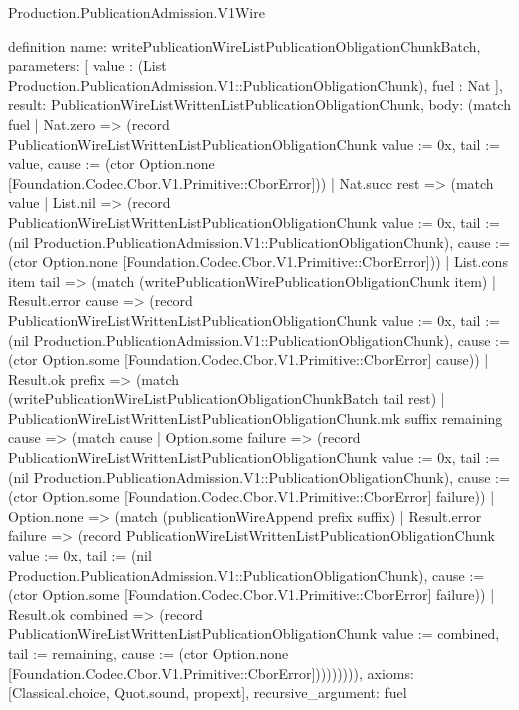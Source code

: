 \begin{lexlean}{Production.PublicationAdmission.V1Wire}
\begin{semanticmodule}
definition{
  name: writePublicationWireListPublicationObligationChunkBatch,
  parameters: [
    value : (List Production.PublicationAdmission.V1::PublicationObligationChunk),
    fuel : Nat
  ],
  result: PublicationWireListWrittenListPublicationObligationChunk,
  body: (match fuel
    | Nat.zero => (record PublicationWireListWrittenListPublicationObligationChunk {value := 0x, tail := value, cause := (ctor Option.none [Foundation.Codec.Cbor.V1.Primitive::CborError])})
    | Nat.succ rest => (match value
      | List.nil => (record PublicationWireListWrittenListPublicationObligationChunk {value := 0x, tail := (nil Production.PublicationAdmission.V1::PublicationObligationChunk), cause := (ctor Option.none [Foundation.Codec.Cbor.V1.Primitive::CborError])})
      | List.cons item tail => (match (writePublicationWirePublicationObligationChunk item)
        | Result.error cause => (record PublicationWireListWrittenListPublicationObligationChunk {value := 0x, tail := (nil Production.PublicationAdmission.V1::PublicationObligationChunk), cause := (ctor Option.some [Foundation.Codec.Cbor.V1.Primitive::CborError] cause)})
        | Result.ok prefix => (match (writePublicationWireListPublicationObligationChunkBatch tail rest)
          | PublicationWireListWrittenListPublicationObligationChunk.mk suffix remaining cause => (match cause
            | Option.some failure => (record PublicationWireListWrittenListPublicationObligationChunk {value := 0x, tail := (nil Production.PublicationAdmission.V1::PublicationObligationChunk), cause := (ctor Option.some [Foundation.Codec.Cbor.V1.Primitive::CborError] failure)})
            | Option.none => (match (publicationWireAppend prefix suffix)
              | Result.error failure => (record PublicationWireListWrittenListPublicationObligationChunk {value := 0x, tail := (nil Production.PublicationAdmission.V1::PublicationObligationChunk), cause := (ctor Option.some [Foundation.Codec.Cbor.V1.Primitive::CborError] failure)})
              | Result.ok combined => (record PublicationWireListWrittenListPublicationObligationChunk {value := combined, tail := remaining, cause := (ctor Option.none [Foundation.Codec.Cbor.V1.Primitive::CborError])}))))))),
  axioms: [Classical.choice, Quot.sound, propext],
  recursive_argument: fuel
}


\end{semanticmodule}
\end{lexlean}

